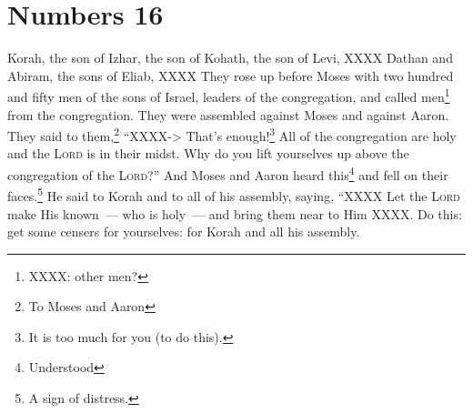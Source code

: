 \section{Numbers 16}\label{Numbers 16}
\begin{enumerate}[align=center]
     Korah, the son of Izhar, the son of Kohath, the son of Levi, XXXX Dathan and Abiram, the sons of Eliab, XXXX%
     They rose up before Moses with two hundred and fifty men of the sons of Israel, leaders of the congregation, and called men\footnote{XXXX: other men?} from the congregation.%
     They were assembled against Moses and against Aaron. They said to them,\footnote{To Moses and Aaron} ``XXXX-> That's enough!\footnote{It is too much for you (to do this).} All of the congregation are holy and the \textsc{Lord} is in their midst. Why do you lift yourselves up above the congregation of the \textsc{Lord}?''%
     And Moses and Aaron heard this\footnote{Understood} and fell on their faces.\footnote{A sign of distress.}%
     He said to Korah and to all of his assembly, saying, ``XXXX Let the \textsc{Lord} make His known~--- who is holy~--- and bring them near to Him XXXX.%
     Do this: get some censers for yourselves: for Korah and all his assembly.%
\end{enumerate}
